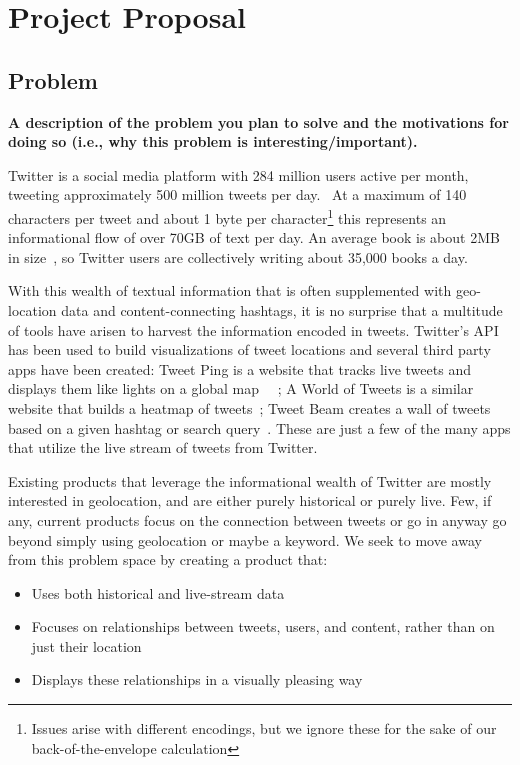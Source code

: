\section{Project Proposal}

\subsection{Problem}
\textbf{A description of the problem you plan to solve and the motivations for doing so (i.e., why this problem is interesting/important).}

Twitter is a social media platform with 284 million users active per month, tweeting approximately 500 million tweets
per day.~\cite{twitter} At a maximum of 140 characters per tweet and about 1 byte per character\footnote{Issues arise with different
encodings, but we ignore these for the sake of our back-of-the-envelope calculation} this represents an informational
flow of over 70GB of text per day. An average book is about 2MB in size~\cite{bookfact}, so Twitter users are collectively
writing about 35,000 books a day.

With this wealth of textual information that is often supplemented with geo-location data and content-connecting hashtags,
it is no surprise that a multitude of tools have arisen to harvest the information encoded in tweets. Twitter's
API~\cite{twitterAPI} has been used to build visualizations of tweet locations and several third party apps
have been created: Tweet Ping is a website that tracks live tweets and displays them like lights on a global map~\cite{tweetping1}
~\cite{tweetping2}; A World of Tweets is a similar website that builds a heatmap of tweets~\cite{worldoftweets}; Tweet Beam
creates a wall of tweets based on a given hashtag or search query~\cite{tweetbeam}. These are just a few of the many apps that
utilize the live stream of tweets from Twitter.

Existing products that leverage the informational wealth of Twitter are mostly interested in geolocation, and are either
purely historical or purely live. Few, if any, current products focus on the connection between tweets or go in anyway go beyond
simply using geolocation or maybe a keyword. We seek to move away from this problem space by creating a product that:
\begin{itemize}[noitemsep]
\item Uses both historical and live-stream data
\item Focuses on relationships between tweets, users, and content, rather than on just their location
\item Displays these relationships in a visually pleasing way
\end{itemize}



